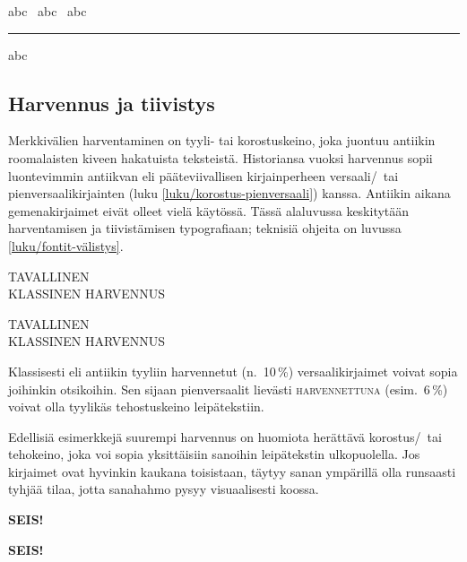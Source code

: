 \begin{tulossis}
  abc \hrulefill\ abc \dotfill\ abc \rule[-.3ex]{5em}{.4bp} abc
\end{tulossis}

\subsection{Harvennus ja tiivistys}
\label{luku/korostus-harvennus}

Merkkivälien harventaminen on tyyli- tai korostuskeino, joka juontuu
antiikin roomalaisten kiveen hakatuista teksteistä. Historiansa vuoksi
harvennus sopii luontevimmin antiikvan eli pääteviivallisen
kirjainperheen versaali\-/\ tai pienversaalikirjainten (luku
\ref{luku/korostus-pienversaali}) kanssa. Antiikin aikana
gemenakirjaimet eivät olleet vielä käytössä. Tässä alaluvussa
keskitytään harventamisen ja tiivistämisen typografiaan; teknisiä
ohjeita on luvussa \ref{luku/fontit-välistys}.

\begin{koodilohkosis}
\large TAVALLINEN \\
{ KLASSINEN HARVENNUS}
\end{koodilohkosis}

\begin{tulossis}
  \large
  TAVALLINEN \\
  { KLASSINEN HARVENNUS}
\end{tulossis}

\noindent
Klassisesti eli antiikin tyyliin harvennetut (n.~10\,\%)
versaalikirjaimet voivat sopia joihinkin otsikoihin. Sen sijaan
pienversaalit lievästi {
  \textsc{harvennettuna}} (esim.~6\,\%) voivat olla tyylikäs
tehostuskeino leipätekstiin.

Edellisiä esimerkkejä suurempi harvennus on huomiota herättävä
korostus\-/\ tai tehokeino, joka voi sopia yksittäisiin sanoihin
leipätekstin ulkopuolella. Jos kirjaimet ovat hyvinkin kaukana
toisistaan, täytyy sanan ympärillä olla runsaasti tyhjää tilaa, jotta
sanahahmo pysyy visuaalisesti koossa.

\begin{koodilohkosis}
{\sffamily\bfseries{} SEIS!}
\end{koodilohkosis}

\begin{tulossis}
  {\sffamily\bfseries{} SEIS!}
\end{tulossis}

